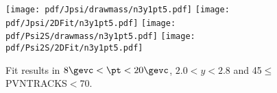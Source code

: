 \begin{figure}[H]
\begin{center}
\texttt{[image: pdf/Jpsi/drawmass/n3y1pt5.pdf]}
\texttt{[image: pdf/Jpsi/2DFit/n3y1pt5.pdf]}
\vspace*{-0.5cm}
\texttt{[image: pdf/Psi2S/drawmass/n3y1pt5.pdf]}
\texttt{[image: pdf/Psi2S/2DFit/n3y1pt5.pdf]}
\vspace*{-0.5cm}
\end{center}
\caption{Fit results in $8\gevc<\pt<20\gevc$, $2.0<y<2.8$ and 45$\leq$PVNTRACKS$<$70.}
\label{Fitn3y1pt5}
\end{figure}
